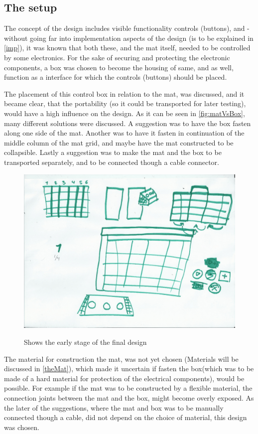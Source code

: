 \subsection{The setup}
The concept of the design includes visible functionality controls (buttons), and - without going far into implementation aspects of the design (is to be explained in \autoref{imp}), it was known that both these, and the mat itself, needed to be controlled by some electronics. For the sake of securing and protecting the electronic components, a box was chosen to become the housing of same, and as well, function as a interface for which the controls (buttons) should be placed. 

The placement of this control box in relation to the mat, was discussed, and it became clear, that the portability (so it could be transported for later testing), would have a high influence on the design. As it can be seen in \autoref{fig:matVsBox}, many different solutions were discussed. A suggestion was to have the box fasten along one side of the mat. Another was to have it fasten in continuation of the middle column of the mat grid, and maybe have the mat constructed to be collapsible. Lastly a suggestion was to make the mat and the box to be transported separately, and to be connected though a cable connector.     

\begin{figure}[H]
	\centering
	\includegraphics[width=0.7\linewidth]{figure/Design/sketchOne}
	\label{fig:sketchOne}
	\caption{Shows the early stage of the final design}
	\label{fig:matVsBox}
\end{figure} 

The material for construction the mat, was not yet chosen (Materials will be discussed in \autoref{theMat}), which made it uncertain if fasten the box(which was to be made of a hard material for protection of the electrical components), would be possible. For example if the mat was to be constructed by a flexible material, the connection joints between the mat and the box, might become overly exposed.
As the later of the suggestions, where the mat and box was to be manually connected though a cable, did not depend on the choice of material, this design was chosen. 


